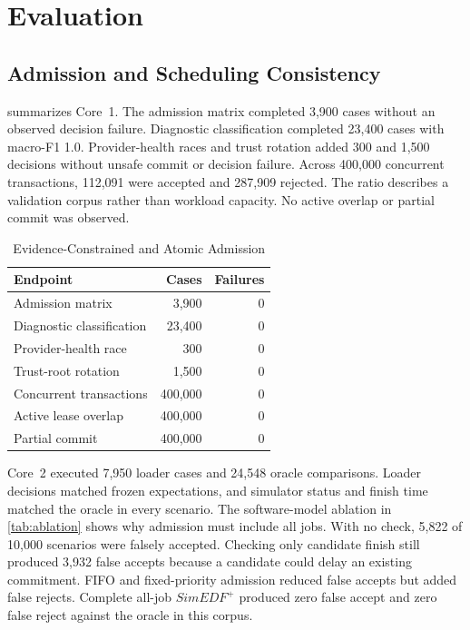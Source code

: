\documentclass[lettersize,journal]{IEEEtran}
\begin{document}
\section{Evaluation}
\subsection{Admission and Scheduling Consistency}
 summarizes Core~1. The admission matrix completed 3,900
cases without an observed decision failure. Diagnostic classification completed
23,400 cases with macro-F1 1.0. Provider-health races and trust rotation added
300 and 1,500 decisions without unsafe commit or decision failure. Across
400,000 concurrent transactions, 112,091 were accepted and 287,909 rejected.
The ratio describes a validation corpus rather than workload capacity. No
active overlap or partial commit was observed.

\begin{table}[t]
\caption{Evidence-Constrained and Atomic Admission}
\label{tab:admission}
\centering
\footnotesize
\begin{tabular}{@{}lrr@{}}
\toprule
Endpoint & Cases & Failures \\
\midrule
Admission matrix & 3,900 & 0 \\
Diagnostic classification & 23,400 & 0 \\
Provider-health race & 300 & 0 \\
Trust-root rotation & 1,500 & 0 \\
Concurrent transactions & 400,000 & 0 \\
Active lease overlap & 400,000 & 0 \\
Partial commit & 400,000 & 0 \\
\bottomrule
\end{tabular}
\end{table}

Core~2 executed 7,950 loader cases and 24,548 oracle comparisons. Loader
decisions matched frozen expectations, and simulator status and finish time
matched the oracle in every scenario. The software-model ablation in
\cref{tab:ablation} shows why admission must include all jobs. With no check,
5,822 of 10,000 scenarios were falsely accepted. Checking only candidate finish
still produced 3,932 false accepts because a candidate could delay an existing
commitment. FIFO and fixed-priority admission reduced false accepts but added
false rejects. Complete all-job $SimEDF^+$ produced zero false accept and zero
false reject against the oracle in this corpus.
\end{document}
